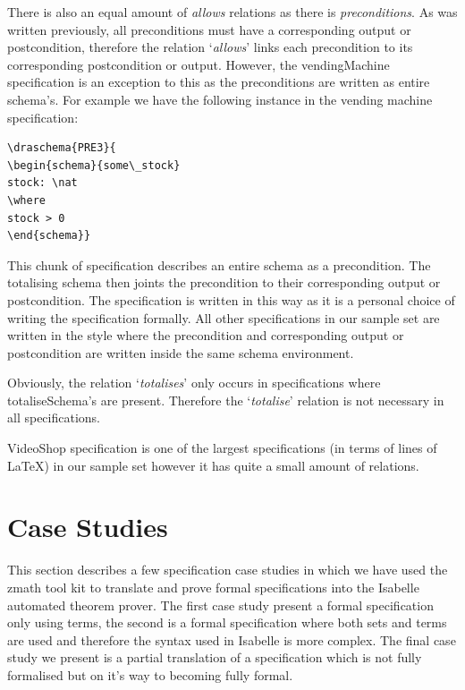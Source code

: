 There is also an equal amount of \emph{allows} relations as there is
\emph{preconditions}. As was written previously, all preconditions must have a
corresponding output or postcondition, therefore the relation `\emph{allows}'
links each precondition to its corresponding postcondition or output. However,
the vendingMachine specification is an exception to this as the preconditions
are written as entire schema's. For example we have the following instance in
the vending machine specification:

\begin{verbatim}
\draschema{PRE3}{
\begin{schema}{some\_stock}
stock: \nat
\where
stock > 0
\end{schema}}
\end{verbatim}

This chunk of specification describes an entire schema as a precondition. The
totalising schema then joints the precondition to their corresponding output or
postcondition. The specification is written in this way as it is a personal
choice of writing the specification formally. All other specifications in our
sample set are written in the style where the precondition and corresponding
output or postcondition are written inside the same schema environment.

Obviously, the relation `\emph{totalises}' only occurs in specifications where
totaliseSchema's are present. Therefore the `\emph{totalise}' relation is not
necessary in all specifications.

VideoShop specification is one of the largest specifications (in terms of lines
of \LaTeX{}) in our sample set however it has quite a small amount of relations.

\section{Case Studies}

This section describes a few specification case studies in which we have used
the \gls{zmath} tool kit to translate and prove formal specifications into the
Isabelle automated theorem prover. The first case study present a formal
specification only using terms, the second is a formal specification where both
sets and terms are used and therefore the syntax used in Isabelle is more
complex. The final case study we present is a partial translation of a
specification which is not fully formalised but on it's way to becoming fully
formal.


